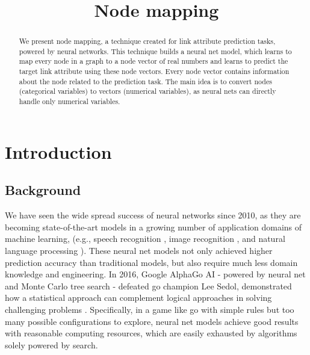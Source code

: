 \documentclass{article}
\begin{document}
\lstset{language=python, tabsize=4}
\title{Node mapping}
\maketitle

\begin{abstract}
	We present node mapping, a technique created for link attribute prediction 
	tasks, powered by neural networks.
	This technique builds a neural net model, which learns to map every node in 
	a graph to a node vector of real numbers and learns to predict the target 
	link attribute using these node vectors.
	Every node vector contains information about the node related to the
	prediction task.
	The main idea is to convert nodes (categorical variables) to vectors 
	(numerical variables), as neural nets can directly handle only numerical 
	variables.
\end{abstract}

\section{Introduction}

\subsection{Background}
We have seen the wide spread success of neural networks since 2010, as they are 
becoming state-of-the-art models in a growing number of application domains of 
machine learning, (e.g., speech recognition \cite{hannun2014deep}, image 
recognition \cite{simonyan2014very}, and natural language 
processing \cite{yao2013recurrent}).
These neural net models not only achieved higher prediction accuracy than 
traditional models, but also require much less domain knowledge and engineering.
In 2016, Google AlphaGo AI - powered by neural net and Monte Carlo tree search 
- defeated go champion Lee Sedol, demonstrated how a statistical approach can 
complement logical approaches in solving challenging 
problems \cite{silver2016mastering}.
Specifically, in a game like go with simple rules but too many possible 
configurations to explore, neural net models achieve good results with 
reasonable computing resources, which are easily exhausted by algorithms solely 
powered by search.
\end{document}
